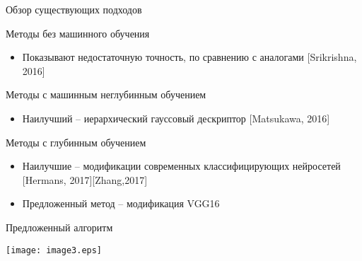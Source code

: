 \documentclass[14pt,mathserif,aspectratio=43]{beamer}
\begin{document}
\begin{frame}{Обзор существующих подходов}

    \textcolor{lab-blue}{Методы без машинного обучения}

    \begin{itemize} \footnotesize 
        \item[] Показывают недостаточную точность, по сравнению с аналогами [Srikrishna, 2016]
    \end{itemize}
    
    \textcolor{lab-blue}{Методы с машинным неглубинным обучением}
    
    \begin{itemize} \footnotesize 
        \item[] Наилучший -- иерархический гауссовый дескриптор [Matsukawa, 2016]
    \end{itemize}
    
    \textcolor{lab-blue}{Методы с глубинным обучением}
    
    \begin{itemize} \footnotesize 
        \item[] Наилучшие -- модификации современных классифицирующих нейросетей [Hermans, 2017][Zhang,2017]
        \item[] Предложенный метод -- модификация VGG16
    \end{itemize}
    
\end{frame}

\begin{frame}{Предложенный алгоритм}
    
    \begin{center}
        \texttt{[image: image3.eps]}
    \end{center}
    
\end{frame}
\end{document}
